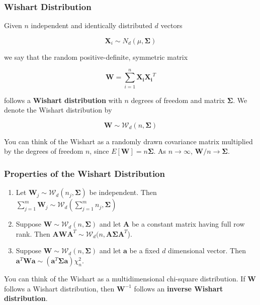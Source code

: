 \documentclass{beamer}
\begin{document}
\begin{frame}
\frametitle{Wishart Distribution}
Given $n$ independent and identically distributed $d$ vectors

$$\mathbf{X}_i \sim N_d(\mu , \mathbf{\Sigma})$$

we say that the random positive-definite, symmetric matrix

$$ \mathbf{W} = \sum_{i = 1}^n \mathbf{X_i} \mathbf{X_i}^T$$

follows a \textbf{Wishart distribution} with $n$ degrees of freedom and matrix $\mathbf{\Sigma}$.  We denote the Wishart distribution by

$$\mathbf{W} \sim \mathcal{W}_d(n, \mathbf{\Sigma})$$

You can think of the Wishart as a randomly drawn covariance matrix multiplied by the degrees of freedom $n$, since $E[\mathbf{W}] = n\mathbf{\Sigma}$.  As $n \rightarrow \infty$, $\mathbf{W}/n \rightarrow \mathbf{\Sigma}$. 
\end{frame}

\begin{frame}
\frametitle{Properties of the Wishart Distribution}
\begin{enumerate}
\item Let $\mathbf{W}_j \sim \mathcal{W}_d(n_j, \mathbf{\Sigma})$ be independent.  Then $\sum_{j = 1}^m \mathbf{W}_j \sim \mathcal{W}_d(\sum_{j=1}^m n_j, \mathbf{\Sigma})$
\item Suppose $\mathbf{W} \sim \mathcal{W}_d(n, \mathbf{\Sigma})$ and let $\mathbf{A}$ be a constant matrix having full row rank.  Then $\mathbf{AWA}^T \sim \mathcal{W}_d(n, \mathbf{A\Sigma A}^T$).
\item  Suppose $\mathbf{W} \sim \mathcal{W}_d(n, \mathbf{\Sigma})$ and let $\mathbf{a}$ be a fixed $d$ dimensional vector.  Then $\mathbf{a}^T\mathbf{Wa} \sim (\mathbf{a}^T\mathbf{\Sigma a})\chi^2_n$.
\end{enumerate}

You can think of the Wishart as a multidimensional chi-square distribution.  If $\mathbf{W}$ follows a Wishart distribution, then $\mathbf{W}^{-1}$ follows an \textbf{inverse Wishart distribution}.
\end{frame}
\end{document}
